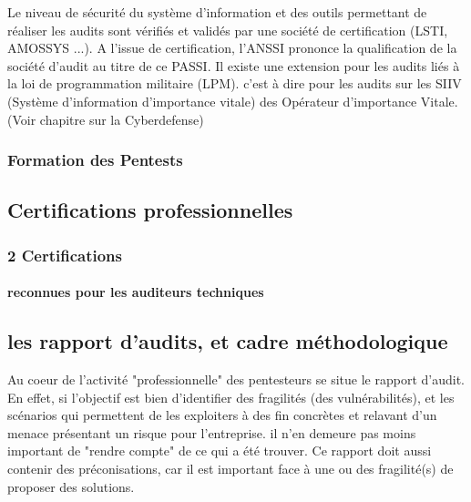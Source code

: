 Le niveau de sécurité du système d'information et des  outils permettant de réaliser les audits sont vérifiés et validés par une société de certification (LSTI, AMOSSYS ...). A l'issue de certification, l'ANSSI prononce la qualification de la société d'audit au titre de ce PASSI. Il existe une extension pour les audits liés à la loi de programmation militaire (LPM). c'est à dire pour les audits sur les SIIV (Système d'information d'importance vitale) des Opérateur d'importance Vitale. (Voir chapitre sur la Cyberdefense)

\subsubsection{Formation des Pentests}

\subsection {Certifications professionnelles}

\begin{frame}
\frametitle<presentation>{2 Certifications}
\framesubtitle<presentation>{reconnues pour les auditeurs techniques}
\end{frame}

\subsection {les rapport d'audits, et cadre méthodologique}

Au coeur de l'activité "professionnelle" des pentesteurs se situe le rapport d'audit.
En effet, si l'objectif est bien d'identifier des fragilités (des vulnérabilités), et les scénarios qui permettent de les exploiters à des fin concrètes et relavant d'un menace présentant un risque pour l'entreprise.
il n'en demeure pas moins important de "rendre compte" de ce qui a été trouver. Ce rapport doit aussi contenir des préconisations, car il est important face à une ou des fragilité(s) de proposer des solutions. 




